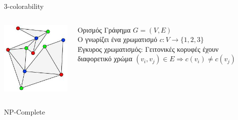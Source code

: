 \documentclass[handout]{beamer}
\begin{document}
\begin{frame}{3-colorability}
\begin{columns}
\begin{center}
\includegraphics[scale=0.5]{3cp.jpg}
\end{center}

\begin{block}{Ορισμός}
Γράφημα $G=(V,E)$ \\ \pause
O \prv  γνωρίζει ένα χρωματισμό  $c:V \rightarrow \{ 1,2,3 \}$  \\ \pause
Έγκυρος χρωματισμός: Γειτονικές κορυφές έχουν διαφορετικό χρώμα
$(v_i, v_j) \in E \Rightarrow   c(v_i) \neq c(v_j)$\\
\end{block}
\end{columns}
NP-Complete
\end{frame}
 
\end{document}
